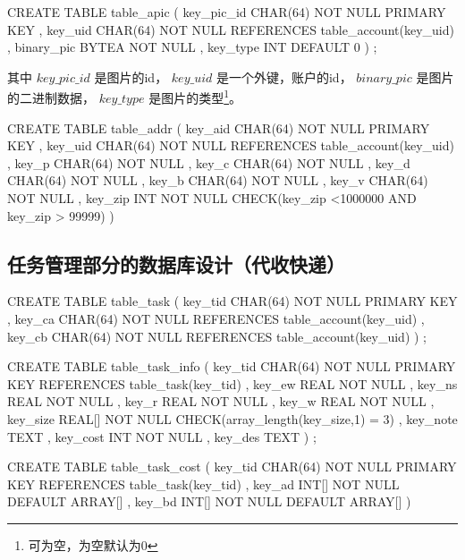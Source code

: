 \begin{sql}[caption=创建账户照片表 table\_apic]
    CREATE TABLE table_apic
        ( key_pic_id CHAR(64) NOT NULL PRIMARY KEY
        , key_uid CHAR(64) NOT NULL REFERENCES table_account(key_uid)
        , binary_pic BYTEA NOT NULL
        , key_type INT DEFAULT 0
        )
    ;
\end{sql}
其中 $key\_pic\_id$ 是图片的id，
$key\_uid$ 是一个外键，账户的id，
$binary\_pic$ 是图片的二进制数据，
$key\_type$ 是图片的类型\footnote{可为空，为空默认为0}。
\begin{sql}[caption=创建用户收货地址表 table\_addr]
	CREATE TABLE table_addr
		( key_aid CHAR(64) NOT NULL PRIMARY KEY
		, key_uid CHAR(64) NOT NULL REFERENCES table_account(key_uid)
		, key_p CHAR(64) NOT NULL 
		, key_c CHAR(64) NOT NULL
		, key_d CHAR(64) NOT NULL
		, key_b CHAR(64) NOT NULL
		, key_v CHAR(64) NOT NULL
		, key_zip INT NOT NULL CHECK(key_zip <1000000 AND key_zip > 99999)
		)
\end{sql}
\subsection{任务管理部分的数据库设计（代收快递）}
\begin{sql}[caption=创建任务关联表 table\_task]
    CREATE TABLE table_task
        ( key_tid CHAR(64) NOT NULL PRIMARY KEY
        , key_ca CHAR(64) NOT NULL REFERENCES table_account(key_uid)
        , key_cb CHAR(64) NOT NULL REFERENCES table_account(key_uid)
        )
    ;
\end{sql}

\begin{sql}[caption=创建任务信息表 table\_task\_info]
    CREATE TABLE table_task_info
        ( key_tid CHAR(64) NOT NULL PRIMARY KEY REFERENCES table_task(key_tid)
        , key_ew REAL NOT NULL
        , key_ns REAL NOT NULL
        , key_r REAL NOT NULL
        , key_w REAL NOT NULL
        , key_size REAL[] NOT NULL CHECK(array_length(key_size,1) = 3)
        , key_note TEXT
        , key_cost INT NOT NULL
        , key_des TEXT
        )
    ;
\end{sql}

\begin{sql}[caption=创建任务议价表 table\_task\_cost]
    CREATE TABLE table_task_cost
        ( key_tid CHAR(64) NOT NULL PRIMARY KEY REFERENCES table_task(key_tid)
        , key_ad INT[] NOT NULL DEFAULT ARRAY[]
        , key_bd INT[] NOT NULL DEFAULT ARRAY[]
        )
\end{sql}


